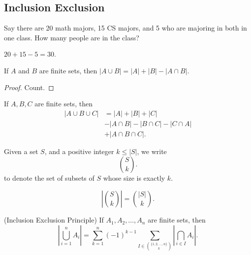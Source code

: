 \subsection{Inclusion Exclusion}

\begin{eg}
	Say there are 20 math majors, 15 CS majors, and 5 who are majoring in both in one class. How many people are in the class?
\end{eg}
\begin{explanation}
	\( 20 + 15 - 5 = 30 \).
\end{explanation}

\begin{lemma}
	If \( A \) and \( B \) are finite sets, then \( |A \cup B| = |A| + |B| - |A \cap B| \).
\end{lemma}
\begin{proof}
	Count.
\end{proof}

\begin{lemma}
	If \( A, B, C \) are finite sets, then
	\begin{align*}
		|A \cup B \cup  C| &= |A| + |B| + |C| \\ &- |A \cap B| - |B \cap C| - | C \cap A| \\ &+ |A \cap B \cap C|
	.\end{align*}
\end{lemma}

\begin{definition}
	Given a set \( S \), and a positive integer \( k \le |S|\), we write \[
		\binom{S}{k}
	.\] to denote the set of subsets of \( S \) whose size is exactly \( k \).
\end{definition}

\begin{note}
	\[
		\left| \binom{S}{k} \right| = \binom{|S|}{k}
	.\] 
\end{note}

\begin{theorem}
	(Inclusion Exclusion Principle) If \( A_{1},A_{2},\ldots ,A_n \) are finite sets, then \[
		\left| \bigcup_{i = 1}^{n} A_i \right| = \sum_{k=1}^{n}	(-1)^{k-1} \sum_{I \in \binom{\{1,2,\ldots ,n\}  }{k}} \left| \bigcap_{i \in I} A_i \right| 
	.\] 
\end{theorem}

